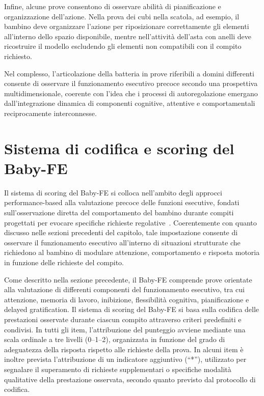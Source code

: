             Infine, alcune prove consentono di osservare abilità di pianificazione e organizzazione dell'azione. Nella prova dei cubi nella scatola, ad esempio, il bambino deve organizzare l'azione per riposizionare correttamente gli elementi all'interno dello spazio disponibile, mentre nell'attività dell'asta con anelli deve ricostruire il modello escludendo gli elementi non compatibili con il compito richiesto.

            Nel complesso, l'articolazione della batteria in prove riferibili a domini differenti consente di osservare il funzionamento esecutivo precoce secondo una prospettiva multidimensionale, coerente con l'idea che i processi di autoregolazione emergano dall'integrazione dinamica di componenti cognitive, attentive e comportamentali reciprocamente interconnesse.

    \section{Sistema di codifica e scoring del Baby-FE}
    \label{sec:3_8}

        Il sistema di scoring del Baby-FE si colloca nell'ambito degli approcci performance-based alla valutazione precoce delle funzioni esecutive, fondati sull'osservazione diretta del comportamento del bambino durante compiti progettati per evocare specifiche richieste regolative~\cite{toplak2013,snyder2021}. Coerentemente con quanto discusso nelle sezioni precedenti del capitolo, tale impostazione consente di osservare il funzionamento esecutivo all'interno di situazioni strutturate che richiedono al bambino di modulare attenzione, comportamento e risposta motoria in funzione delle richieste del compito.

        Come descritto nella sezione precedente, il Baby-FE comprende prove orientate alla valutazione di differenti componenti del funzionamento esecutivo, tra cui attenzione, memoria di lavoro, inibizione, flessibilità cognitiva, pianificazione e delayed gratification. Il sistema di scoring del Baby-FE si basa sulla codifica delle prestazioni osservate durante ciascun compito attraverso criteri predefiniti e condivisi. In tutti gli item, l'attribuzione del punteggio avviene mediante una scala ordinale a tre livelli (0--1--2), organizzata in funzione del grado di adeguatezza della risposta rispetto alle richieste della prova. In alcuni item è inoltre prevista l'attribuzione di un indicatore aggiuntivo (``*''), utilizzato per segnalare il superamento di richieste supplementari o specifiche modalità qualitative della prestazione osservata, secondo quanto previsto dal protocollo di codifica.

